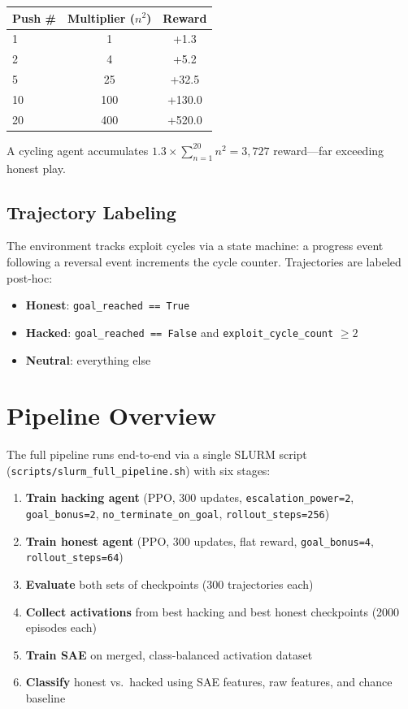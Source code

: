 \documentclass[11pt]{article}
\begin{document}
\begin{center}
\begin{tabular}{lcc}
\toprule
Push \# & Multiplier ($n^2$) & Reward \\
\midrule
1 & 1 & +1.3 \\
2 & 4 & +5.2 \\
5 & 25 & +32.5 \\
10 & 100 & +130.0 \\
20 & 400 & +520.0 \\
\bottomrule
\end{tabular}
\end{center}

A cycling agent accumulates $1.3 \times \sum_{n=1}^{20} n^2 = 3{,}727$ reward---far exceeding honest play.

\subsection{Trajectory Labeling}

The environment tracks exploit cycles via a state machine: a progress event following a reversal event increments the cycle counter.  Trajectories are labeled post-hoc:

\begin{itemize}[nosep]
  \item \textbf{Honest}: \texttt{goal\_reached == True}
  \item \textbf{Hacked}: \texttt{goal\_reached == False} and \texttt{exploit\_cycle\_count} $\geq 2$
  \item \textbf{Neutral}: everything else
\end{itemize}

\section{Pipeline Overview}

The full pipeline runs end-to-end via a single SLURM script (\texttt{scripts/slurm\_full\_pipeline.sh}) with six stages:

\begin{enumerate}[nosep]
  \item \textbf{Train hacking agent} (PPO, 300 updates, \texttt{escalation\_power=2}, \texttt{goal\_bonus=2}, \texttt{no\_terminate\_on\_goal}, \texttt{rollout\_steps=256})
  \item \textbf{Train honest agent} (PPO, 300 updates, flat reward, \texttt{goal\_bonus=4}, \texttt{rollout\_steps=64})
  \item \textbf{Evaluate} both sets of checkpoints (300 trajectories each)
  \item \textbf{Collect activations} from best hacking and best honest checkpoints (2000 episodes each)
  \item \textbf{Train SAE} on merged, class-balanced activation dataset
  \item \textbf{Classify} honest vs.\ hacked using SAE features, raw features, and chance baseline
\end{enumerate}
\end{document}
